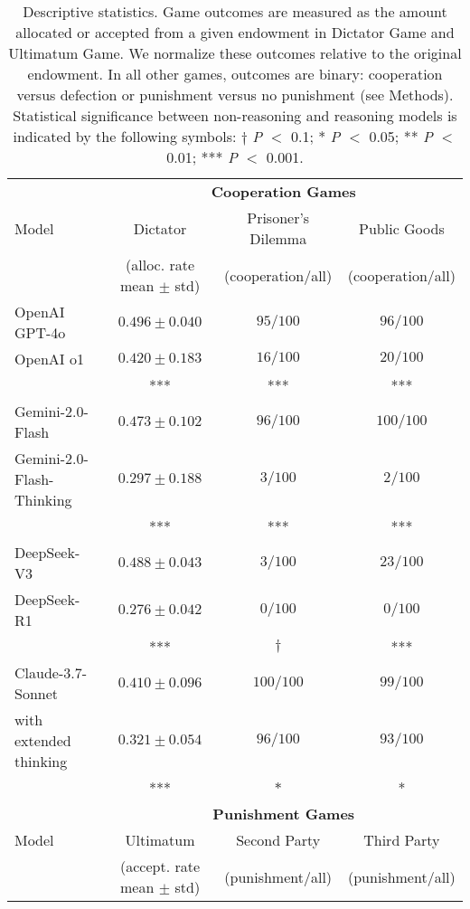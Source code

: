 \begin{table}[h]
    \centering
    \caption{Descriptive statistics. Game outcomes are measured as the amount allocated or accepted from a given endowment in Dictator Game and Ultimatum Game. We normalize these outcomes relative to the original endowment.
In all other games, outcomes are binary: cooperation versus defection or punishment versus no punishment (see Methods). Statistical significance between non-reasoning and reasoning models is indicated by the following symbols: $\dagger$ \textit{P} $<$ 0.1; * \textit{P} $<$ 0.05; ** \textit{P} $<$ 0.01; *** \textit{P} $<$ 0.001.}
    \label{tab:model_comparison}
    \begin{tabular}{lccc}
        \toprule
        & \multicolumn{3}{c}{\textbf{Cooperation Games}} \\
        \cmidrule(lr){2-4}
        Model & Dictator & Prisoner's Dilemma & Public Goods \\
        & (alloc. rate mean $\pm$ std) & (cooperation/all) & (cooperation/all) \\
        \midrule
        OpenAI GPT-4o & $0.496 \pm 0.040$ & $95/100$ & $96/100$ \\
        OpenAI o1 & $0.420 \pm 0.183$ & $16/100$ & $20/100$ \\
        & *** & *** & ***\\
        Gemini-2.0-Flash & $0.473 \pm 0.102$ & $96/100$ & $100/100$ \\
        Gemini-2.0-Flash-Thinking & $0.297 \pm 0.188$ & $3/100$ & $2/100$ \\
        & *** & *** & ***\\
        DeepSeek-V3 & $0.488 \pm 0.043$ & $3/100$ & $23/100$ \\
        DeepSeek-R1 & $0.276 \pm 0.042$ & $0/100$ & $0/100$ \\
        & *** & $\dagger$ & ***\\
        Claude-3.7-Sonnet & $0.410 \pm 0.096$ & $100/100$ & $99/100$ \\
        with extended thinking & $0.321 \pm 0.054$ & $96/100$ & $93/100$ \\
        & *** & $ * $ & *\\
        \midrule
        & \multicolumn{3}{c}{\textbf{Punishment Games}} \\
        \cmidrule(lr){2-4}
        Model & Ultimatum & Second Party & Third Party \\
        & (accept. rate mean $\pm$ std) & (punishment/all) & (punishment/all) \\

\end{tabular}
\end{table}
